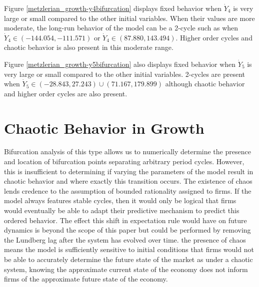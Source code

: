 Figure \ref{metzlerian_growth-y4bifurcation} displays fixed behavior when $\dot Y_4$ is very large or small compared to the other initial variables. When their values are more moderate, the long-run behavior of the model can be a 2-cycle such as when $\dot Y_4\in(-144.054, -111.571)$ or $\dot Y_4\in(87.880, 143.494)$. Higher order cycles and chaotic behavior is also present in this moderate range.


Figure \ref{metzlerian_growth-y5bifurcation} also displays fixed behavior when $\dot Y_5$ is very large or small compared to the other initial variables. 2-cycles are present when $\dot Y_5\in(-28.843, 27.243)\cup(71.167, 179.899)$ although chaotic behavior and higher order cycles are also present.

\section{Chaotic Behavior in Growth}
Bifurcation analysis of this type allows us to numerically determine the presence and location of bifurcation points separating arbitrary period cycles. However, this is insufficient to determining if varying the parameters of the model result in chaotic behavior and where exactly this transition occurs. The existence of chaos lends credence to the assumption of bounded rationality assigned to firms. If the model always features stable cycles, then it would only be logical that firms would eventually be able to adapt their predictive mechanism to predict this ordered behavior. The effect this shift in expectation rule would have on future dynamics is beyond the scope of this paper but could be performed by removing the Lundberg lag after the system has evolved over time.  the presence of chaos means the model is sufficiently sensitive to initial conditions that firms would not be able to accurately determine the future state of the market as under a chaotic system, knowing the approximate current state of the economy does not inform firms of the approximate future state of the economy. 

